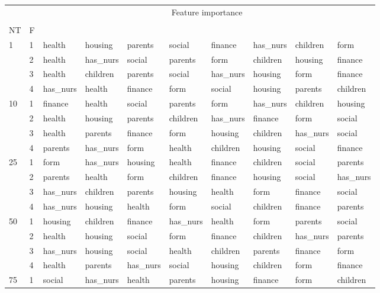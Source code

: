 \begin{table}[htbp]
\centering
\label{nursery-features}
\begin{tabular}{llllllllll}
\toprule
 &  & \multicolumn{8}{c}{Feature importance} \\
 &  & #1 & #2 & #3 & #4 & #5 & #6 & #7 & #8 \\
NT & F &  &  &  &  &  &  &  &  \\
\midrule
\multirow[c]{4}{*}{1} & 1 & health & housing & parents & social & finance & has_nurs & children & form \\
 & 2 & health & has_nurs & social & parents & form & children & housing & finance \\
 & 3 & health & children & parents & social & has_nurs & housing & form & finance \\
 & 4 & has_nurs & health & finance & form & social & housing & parents & children \\
\multirow[c]{4}{*}{10} & 1 & finance & health & social & parents & form & has_nurs & children & housing \\
 & 2 & health & housing & parents & children & has_nurs & finance & form & social \\
 & 3 & health & parents & finance & form & housing & children & has_nurs & social \\
 & 4 & parents & has_nurs & form & health & children & housing & social & finance \\
\multirow[c]{4}{*}{25} & 1 & form & has_nurs & housing & health & finance & children & social & parents \\
 & 2 & parents & health & form & children & finance & housing & social & has_nurs \\
 & 3 & has_nurs & children & parents & housing & health & form & finance & social \\
 & 4 & has_nurs & housing & health & form & social & children & finance & parents \\
\multirow[c]{4}{*}{50} & 1 & housing & children & finance & has_nurs & health & form & parents & social \\
 & 2 & health & housing & social & form & finance & children & has_nurs & parents \\
 & 3 & has_nurs & housing & social & health & children & parents & finance & form \\
 & 4 & health & parents & has_nurs & social & housing & children & form & finance \\
\multirow[c]{4}{*}{75} & 1 & social & has_nurs & health & parents & housing & finance & form & children \\

\end{tabular}
\end{table}
